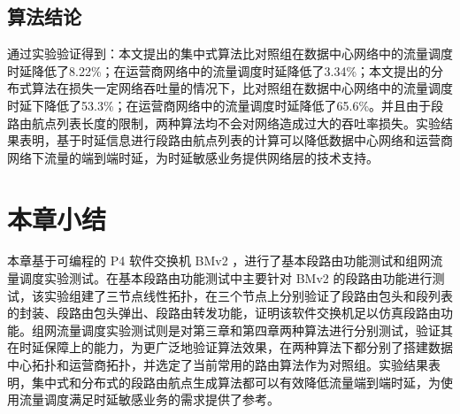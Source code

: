 \subsection{算法结论}

通过实验验证得到：本文提出的集中式算法比对照组在数据中心网络中的流量调度时延降低了8.22\%；在运营商网络中的流量调度时延降低了3.34\%；本文提出的分布式算法在损失一定网络吞吐量的情况下，比对照组在数据中心网络中的流量调度时延下降低了53.3\%；在运营商网络中的流量调度时延降低了65.6\%。并且由于段路由航点列表长度的限制，两种算法均不会对网络造成过大的吞吐率损失。实验结果表明，基于时延信息进行段路由航点列表的计算可以降低数据中心网络和运营商网络下流量的端到端时延，为时延敏感业务提供网络层的技术支持。

\section{本章小结}

本章基于可编程的 \gls*{P4} 软件交换机 \gls*{BMv2} ，进行了基本段路由功能测试和组网流量调度实验测试。在基本段路由功能测试中主要针对 \gls*{BMv2} 的段路由功能进行测试，该实验组建了三节点线性拓扑，在三个节点上分别验证了段路由包头和段列表的封装、段路由包头弹出、段路由转发功能，证明该软件交换机足以仿真段路由功能。组网流量调度实验测试则是对第三章和第四章两种算法进行分别测试，验证其在时延保障上的能力，为更广泛地验证算法效果，在两种算法下都分别了搭建数据中心拓扑和运营商拓扑，并选定了当前常用的路由算法作为对照组。实验结果表明，集中式和分布式的段路由航点生成算法都可以有效降低流量端到端时延，为使用流量调度满足时延敏感业务的需求提供了参考。


\ifx\usechapbib\empty
\nocite{BSTcontrol}
\setcounter{NAT@ctr}{0}


\fi

